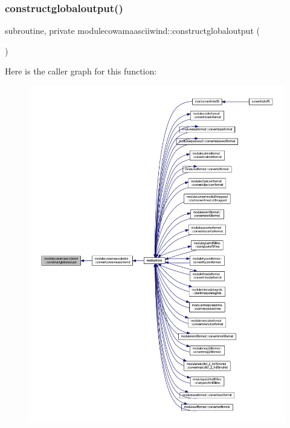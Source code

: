 \subsubsection{\texorpdfstring{constructglobaloutput()}{constructglobaloutput()}}
{\footnotesize\ttfamily subroutine, private modulecowamaasciiwind\+::constructglobaloutput (\begin{DoxyParamCaption}{ }\end{DoxyParamCaption})\hspace{0.3cm}{\ttfamily [private]}}

Here is the caller graph for this function\+:\nopagebreak
\begin{figure}[H]
\begin{center}
\leavevmode
\includegraphics[width=350pt]{namespacemodulecowamaasciiwind_a52864e15417a95bd07a7bac59fc24b28_icgraph}
\end{center}
\end{figure}
\mbox{\label{namespacemodulecowamaasciiwind_a76bf63c9a36126aed55309270f63abe4}} 
